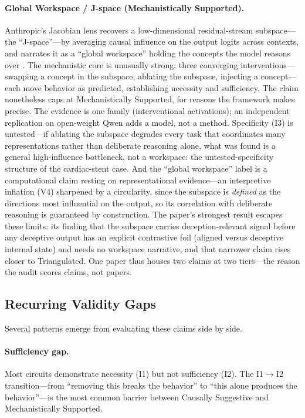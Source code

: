 \documentclass{article}
\begin{document}
\paragraph{Global Workspace / J-space (Mechanistically Supported).} Anthropic's Jacobian lens recovers a low-dimensional residual-stream subspace---the ``J-space''---by averaging causal influence on the output logits across contexts, and narrates it as a ``global workspace'' holding the concepts the model reasons over \citep{anthropic2026workspace}. The mechanistic core is unusually strong: three converging interventions---swapping a concept in the subspace, ablating the subspace, injecting a concept---each move behavior as predicted, establishing necessity and sufficiency. The claim nonetheless caps at Mechanistically Supported, for reasons the framework makes precise. The evidence is one family (interventional activations); an independent replication on open-weight Qwen adds a model, not a method. Specificity (I3) is untested---if ablating the subspace degrades every task that coordinates many representations rather than deliberate reasoning alone, what was found is a general high-influence bottleneck, not a workspace: the untested-specificity structure of the cardiac-stent case. And the ``global workspace'' label is a computational claim resting on representational evidence---an interpretive inflation (V4) sharpened by a circularity, since the subspace is \emph{defined} as the directions most influential on the output, so its correlation with deliberate reasoning is guaranteed by construction. The paper's strongest result escapes these limits: its finding that the subspace carries deception-relevant signal before any deceptive output has an explicit contrastive foil (aligned versus deceptive internal state) and needs no workspace narrative, and that narrower claim rises closer to Triangulated. One paper thus houses two claims at two tiers---the reason the audit scores claims, not papers.

\subsection{Recurring Validity Gaps}

Several patterns emerge from evaluating these claims side by side.

\paragraph{Sufficiency gap.} Most circuits demonstrate necessity (I1) but not sufficiency (I2). The I1$\rightarrow$I2 transition---from ``removing this breaks the behavior'' to ``this alone produces the behavior''---is the most common barrier between Causally Suggestive and Mechanistically Supported.
\end{document}
